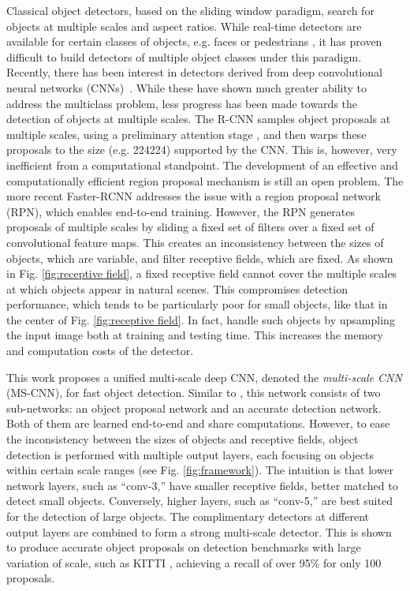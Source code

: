\documentclass[runningheads]{llncs}
\begin{document}
Classical object detectors, based on the sliding window paradigm,
search for objects at multiple scales and aspect ratios. While real-time
detectors are available for certain classes of objects, e.g. faces or
pedestrians \cite{DBLP:journals/ijcv/ViolaJ04,DBLP:journals/pami/DollarABP14},
it has proven difficult to build detectors of multiple object classes
under this paradigm.
Recently, there has been interest in detectors derived from deep
convolutional neural networks (CNNs)~\cite{DBLP:conf/cvpr/GirshickDDM14,DBLP:conf/iccv/Girshick15,DBLP:conf/nips/XiaozhiNIPS15,DBLP:conf/eccv/HeZR014,DBLP:conf/iccv/GidarisK15}.  While these have shown much greater ability to address the
multiclass problem, less progress has been made towards the detection
of objects at multiple scales. The R-CNN \cite{DBLP:conf/cvpr/GirshickDDM14}
samples object proposals at multiple scales, using a preliminary attention
stage \cite{DBLP:conf/iccv/SandeUGS11}, and then warps these proposals to
the size (e.g. 224224) supported by the CNN. This is, however,
very inefficient from a computational standpoint. The development of
an effective and computationally efficient region proposal mechanism
is still an open problem. The more recent
Faster-RCNN \cite{DBLP:conf/nips/shaoqing15fasterRcnn} addresses the issue
with a region proposal network (RPN), which enables end-to-end
training. However, the RPN generates proposals of multiple scales by sliding a
fixed set of filters over a fixed set of convolutional feature maps.
This creates an inconsistency between the sizes of objects, which are
variable, and filter receptive fields, which are fixed. As shown in
Fig. \ref{fig:receptive field}, a fixed receptive field cannot cover
the multiple scales at which objects appear in natural scenes.
This compromises detection performance, which tends to be particularly poor
for small objects, like that in the center of Fig. \ref{fig:receptive field}.
In fact, \cite{DBLP:conf/iccv/Girshick15,DBLP:conf/nips/XiaozhiNIPS15,DBLP:conf/nips/shaoqing15fasterRcnn} handle such objects by upsampling the input
image both at training and testing time. This increases the memory
and computation costs of the detector.

This work proposes a unified multi-scale deep CNN,
denoted the {\it multi-scale CNN\/} (MS-CNN), for fast object detection.
Similar to \cite{DBLP:conf/nips/shaoqing15fasterRcnn}, this
network consists of two sub-networks: an object proposal network and an
accurate detection network. Both of them are learned end-to-end and share
computations. However, to ease the inconsistency between the sizes of
objects and receptive fields, object detection is performed with multiple
output layers, each focusing on objects within certain scale ranges
(see Fig. \ref{fig:framework}). The intuition is that lower network layers,
such as ``conv-3,'' have smaller receptive fields, better matched
to detect small objects. Conversely, higher layers, such as ``conv-5,''
are best suited for the detection of large objects. The complimentary
detectors at different output layers are combined to form a strong
multi-scale detector. This is shown to produce accurate object
proposals on detection benchmarks with large variation
of scale, such as KITTI \cite{DBLP:conf/cvpr/GeigerLU12},
achieving a recall of over 95\% for only 100 proposals.
\end{document}
